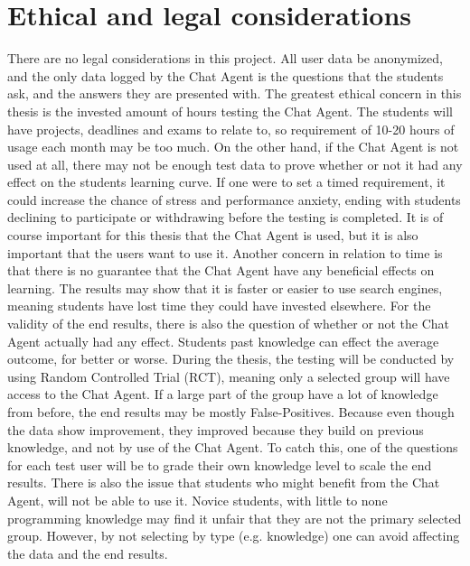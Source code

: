 \chapter{Ethical and legal considerations}
\label{chapter8:ethical_legal_considerations}
There are no legal considerations in this project. All user data be anonymized, and the only data logged by the Chat Agent is the questions that the students ask, and the answers 
they are presented with. The greatest ethical concern in this thesis is the invested amount of hours testing the Chat Agent. The students will have projects, deadlines and exams 
to relate to, so requirement of 10-20 hours of usage each month may be too much. On the other hand, if the Chat Agent is not used at all, there may not be enough test data to prove 
whether or not it had any effect on the students learning curve. If one were to set a timed requirement, it could increase the chance of stress and performance anxiety, ending with 
students declining to participate or withdrawing before the testing is completed. It is of course important for this thesis that the Chat Agent is used, but it is also important that 
the users want to use it. Another concern in relation to time is that there is no guarantee that the Chat Agent have any beneficial effects on learning. The results may show that it 
is faster or easier to use search engines, meaning students have lost time they could have invested elsewhere.
\vspace{0.5em}\newline
For the validity of the end results, there is also the question of whether or not the Chat Agent actually had any effect. Students past knowledge can effect the average outcome, 
for better or worse. During the thesis, the testing will be conducted by using Random Controlled Trial (RCT), meaning only a selected group will have access to the Chat Agent. 
If a large part of the 
group have a lot of knowledge from before, the end results may be mostly False-Positives. Because even though the data show improvement, they improved because they build on previous 
knowledge, and not by use of the Chat Agent. To catch this, one of the questions for each test user will be to grade their own knowledge level to scale the end results. There is 
also the issue that students who might benefit from the Chat Agent, will not be able to use it. Novice students, with little to none programming knowledge may find it unfair that 
they are not the primary selected group. However, by not selecting by type (e.g. knowledge) one can avoid affecting the data and the end results.
